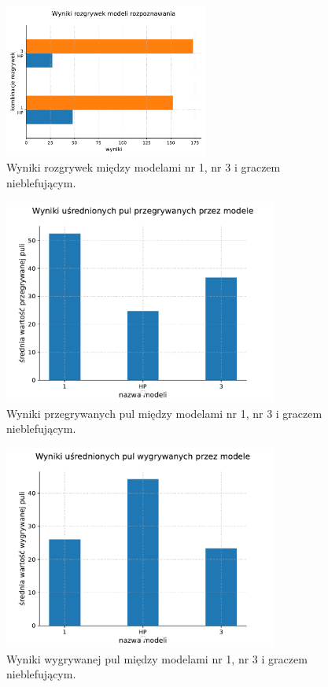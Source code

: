 \documentclass[12pt,oneside,a4paper]{report}
\begin{document}
\begin{figure}[!ht]
  \centering
  \includegraphics[width=0.6\textwidth]{./img/honest1.pdf}
  \caption{Wyniki rozgrywek między modelami nr 1, nr 3 i graczem nieblefującym.}
\end{figure}



\begin{figure}[!ht]
  \centering
  \includegraphics[width=0.8\textwidth]{./img/honest2.pdf}
  \caption{Wyniki przegrywanych pul między modelami nr 1, nr 3 i graczem nieblefującym.}
\end{figure}

\begin{figure}[!ht]
  \centering
  \includegraphics[width=0.8\textwidth]{./img/honest3.pdf}
  \caption{Wyniki wygrywanej pul między modelami nr 1, nr 3 i graczem nieblefującym.}
\end{figure}
\end{document}
